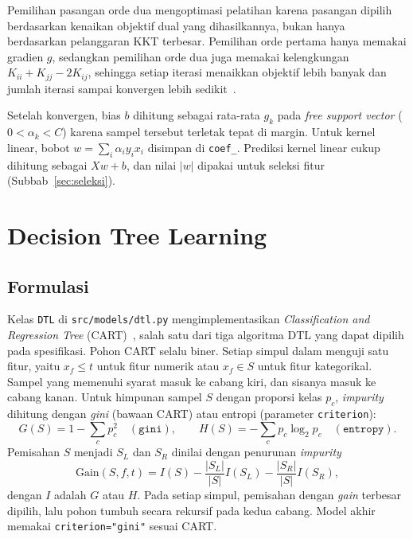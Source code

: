 Pemilihan pasangan orde dua mengoptimasi pelatihan karena pasangan dipilih
berdasarkan kenaikan objektif dual yang dihasilkannya, bukan hanya berdasarkan
pelanggaran KKT terbesar. Pemilihan orde pertama hanya memakai gradien $g$,
sedangkan pemilihan orde dua juga memakai kelengkungan
$K_{ii}+K_{jj}-2K_{ij}$, sehingga setiap iterasi menaikkan objektif lebih
banyak dan jumlah iterasi sampai konvergen lebih sedikit~\cite{fan2005wss}.

Setelah konvergen, bias $b$ dihitung sebagai rata-rata $g_k$ pada \textit{free
support vector} ($0<\alpha_k<C$) karena sampel tersebut terletak tepat di margin.
Untuk kernel linear, bobot $w=\sum_i\alpha_i y_i x_i$ disimpan di
\texttt{coef\_}. Prediksi kernel linear cukup dihitung sebagai $Xw+b$, dan nilai
$|w|$ dipakai untuk seleksi fitur (Subbab~\ref{sec:seleksi}).





\section{Decision Tree Learning}
\label{sec:dtl}

\subsection{Formulasi}

Kelas \texttt{DTL} di \texttt{src/models/dtl.py} mengimplementasikan
\textit{Classification and Regression Tree} (CART)~\cite{breiman1984cart}, salah
satu dari tiga algoritma DTL yang dapat dipilih pada spesifikasi. Pohon CART
selalu biner. Setiap simpul dalam menguji satu fitur, yaitu $x_f\le t$ untuk
fitur numerik atau $x_f\in S$ untuk fitur kategorikal. Sampel yang memenuhi
syarat masuk ke cabang kiri, dan sisanya masuk ke cabang kanan. Untuk himpunan
sampel $S$ dengan proporsi kelas $p_c$, \textit{impurity} dihitung dengan
\textit{gini} (bawaan CART) atau entropi (parameter \texttt{criterion}):
\begin{equation}
	G(S)=1-\sum_{c}p_c^2 \quad(\texttt{gini}),\qquad
	H(S)=-\sum_{c}p_c\log_2 p_c \quad(\texttt{entropy}).
\end{equation}
Pemisahan $S$ menjadi $S_L$ dan $S_R$ dinilai dengan penurunan \textit{impurity}
\begin{equation}
	\text{Gain}(S,f,t)=I(S)-\frac{|S_L|}{|S|}I(S_L)-\frac{|S_R|}{|S|}I(S_R),
\end{equation}
dengan $I$ adalah $G$ atau $H$. Pada setiap simpul, pemisahan dengan
\textit{gain} terbesar dipilih, lalu pohon tumbuh secara rekursif pada kedua
cabang. Model akhir memakai \texttt{criterion="gini"} sesuai CART.

